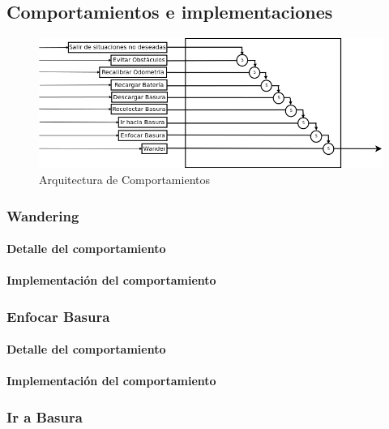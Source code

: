 
\subsection{Comportamientos e implementaciones}
\label{comportamientos}

\begin{figure}[htp]
\begin{center}
\includegraphics[scale=0.5]{comportamientos/behavioursArchitecture.png}
\caption{Arquitectura de Comportamientos}
\label{fig:architecture}
\end{center}
\end{figure}

\subsubsection{Wandering}
\label{wandering}
\paragraph{Detalle del comportamiento}
\paragraph{Implementaci\'on del comportamiento}

\subsubsection{Enfocar Basura}
\label{focus_garbage}
\paragraph{Detalle del comportamiento}
\paragraph{Implementaci\'on del comportamiento}

\subsubsection{Ir a Basura}
\label{go_to_garbage}

